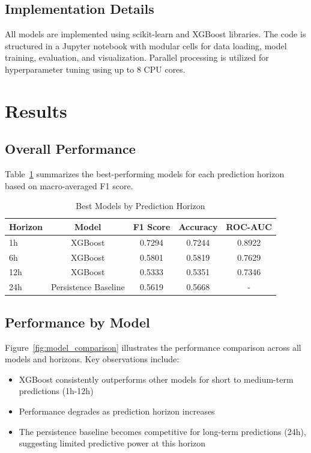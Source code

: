 \documentclass[12pt,a4paper]{article}
\begin{document}
\subsection{Implementation Details}

All models are implemented using scikit-learn \cite{scikit-learn} and XGBoost libraries. The code is structured in a Jupyter notebook with modular cells for data loading, model training, evaluation, and visualization. Parallel processing is utilized for hyperparameter tuning using up to 8 CPU cores.

\section{Results}

\subsection{Overall Performance}

Table~\ref{tab:best_models} summarizes the best-performing models for each prediction horizon based on macro-averaged F1 score.

\begin{table}[H]
\centering
\caption{Best Models by Prediction Horizon}
\label{tab:best_models}
\begin{tabular}{@{}lcccc@{}}
\toprule
\textbf{Horizon} & \textbf{Model} & \textbf{F1 Score} & \textbf{Accuracy} & \textbf{ROC-AUC} \\
\midrule
1h & XGBoost & 0.7294 & 0.7244 & 0.8922 \\
6h & XGBoost & 0.5801 & 0.5819 & 0.7629 \\
12h & XGBoost & 0.5333 & 0.5351 & 0.7346 \\
24h & Persistence Baseline & 0.5619 & 0.5668 & - \\
\bottomrule
\end{tabular}
\end{table}

\subsection{Performance by Model}

Figure~\ref{fig:model_comparison} illustrates the performance comparison across all models and horizons. Key observations include:

\begin{itemize}
    \item XGBoost consistently outperforms other models for short to medium-term predictions (1h-12h)
    \item Performance degrades as prediction horizon increases
    \item The persistence baseline becomes competitive for long-term predictions (24h), suggesting limited predictive power at this horizon
\end{itemize}
\end{document}

